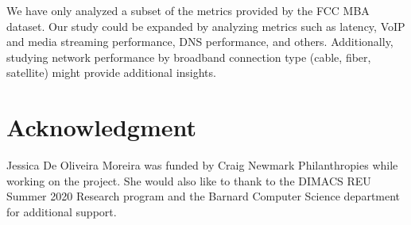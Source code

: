\documentclass[conference,10pt]{IEEEtran}
\begin{document}
We have only analyzed a subset of the metrics provided by the FCC MBA dataset. Our study could be expanded by analyzing metrics such as latency, VoIP and media streaming performance, DNS performance, and others. Additionally, studying network performance by broadband connection type (cable, fiber, satellite) might provide additional insights. 

\section*{Acknowledgment}
\label{sec:acknowledgment}

Jessica De Oliveira Moreira was funded by Craig Newmark Philanthropies while working on the project. She would also like to thank to the DIMACS REU Summer 2020 Research program and the Barnard Computer Science department for additional support.



\end{document}
